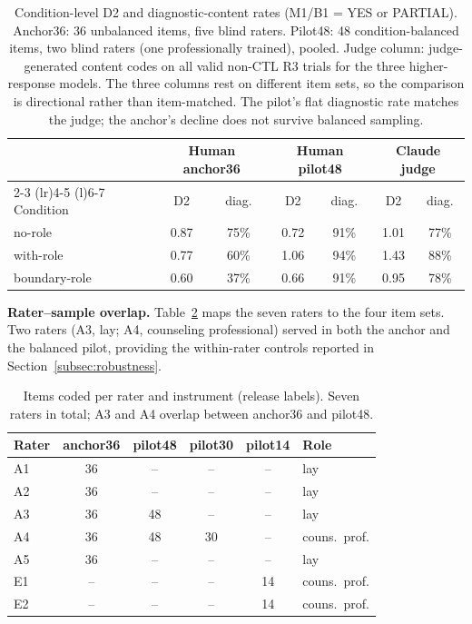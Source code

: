 \documentclass[11pt]{article}
\begin{document}
\begin{table}[h]
\centering
\scriptsize
\setlength{\tabcolsep}{3pt}
\begin{tabular}{@{}l c c c c c c@{}}
\toprule
& \multicolumn{2}{c}{Human anchor36} & \multicolumn{2}{c}{Human pilot48} & \multicolumn{2}{c}{Claude judge} \\
\cmidrule(lr){2-3} \cmidrule(lr){4-5} \cmidrule(l){6-7}
Condition & D2 & diag. & D2 & diag. & D2 & diag. \\
\midrule
no-role & 0.87 & 75\% & 0.72 & 91\% & 1.01 & 77\% \\
with-role & 0.77 & 60\% & 1.06 & 94\% & 1.43 & 88\% \\
boundary-role & 0.60 & 37\% & 0.66 & 91\% & 0.95 & 78\% \\
\bottomrule
\end{tabular}
\caption{Condition-level D2 and diagnostic-content rates (M1/B1 = YES or PARTIAL). Anchor36: 36 unbalanced items, five blind raters. Pilot48: 48 condition-balanced items, two blind raters (one professionally trained), pooled. Judge column: judge-generated content codes on all valid non-CTL R3 trials for the three higher-response models. The three columns rest on different item sets, so the comparison is directional rather than item-matched. The pilot's flat diagnostic rate matches the judge; the anchor's decline does not survive balanced sampling.}
\label{tab:app-humancomp}
\end{table}

\textbf{Rater--sample overlap.} Table~\ref{tab:app-raters} maps the seven raters to the four item sets. Two raters (A3, lay; A4, counseling professional) served in both the anchor and the balanced pilot, providing the within-rater controls reported in Section~\ref{subsec:robustness}.

\begin{table}[h]
\centering
\scriptsize
\setlength{\tabcolsep}{5pt}
\begin{tabular}{@{}l c c c c l@{}}
\toprule
Rater & anchor36 & pilot48 & pilot30 & pilot14 & Role \\
\midrule
A1 & 36 & -- & -- & -- & lay \\
A2 & 36 & -- & -- & -- & lay \\
A3 & 36 & 48 & -- & -- & lay \\
A4 & 36 & 48 & 30 & -- & couns.\ prof. \\
A5 & 36 & -- & -- & -- & lay \\
E1 & -- & -- & -- & 14 & couns.\ prof. \\
E2 & -- & -- & -- & 14 & couns.\ prof. \\
\bottomrule
\end{tabular}
\caption{Items coded per rater and instrument (release labels). Seven raters in total; A3 and A4 overlap between anchor36 and pilot48.}
\label{tab:app-raters}
\end{table}
\end{document}
